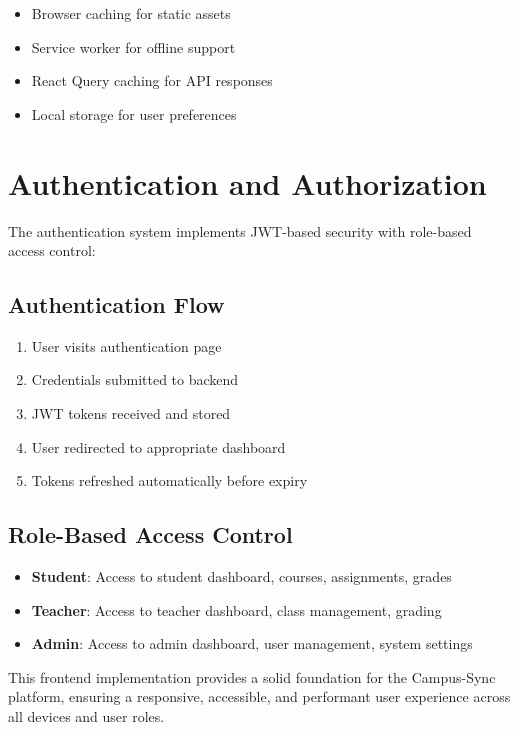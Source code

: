 \begin{itemize}
    \item Browser caching for static assets
    \item Service worker for offline support
    \item React Query caching for API responses
    \item Local storage for user preferences
\end{itemize}

\section{Authentication and Authorization}

The authentication system implements JWT-based security with role-based access control:

\subsection{Authentication Flow}

\begin{enumerate}
    \item User visits authentication page
    \item Credentials submitted to backend
    \item JWT tokens received and stored
    \item User redirected to appropriate dashboard
    \item Tokens refreshed automatically before expiry
\end{enumerate}

\subsection{Role-Based Access Control}

\begin{itemize}
    \item \textbf{Student}: Access to student dashboard, courses, assignments, grades
    \item \textbf{Teacher}: Access to teacher dashboard, class management, grading
    \item \textbf{Admin}: Access to admin dashboard, user management, system settings
\end{itemize}

This frontend implementation provides a solid foundation for the Campus-Sync platform, ensuring a responsive, accessible, and performant user experience across all devices and user roles.